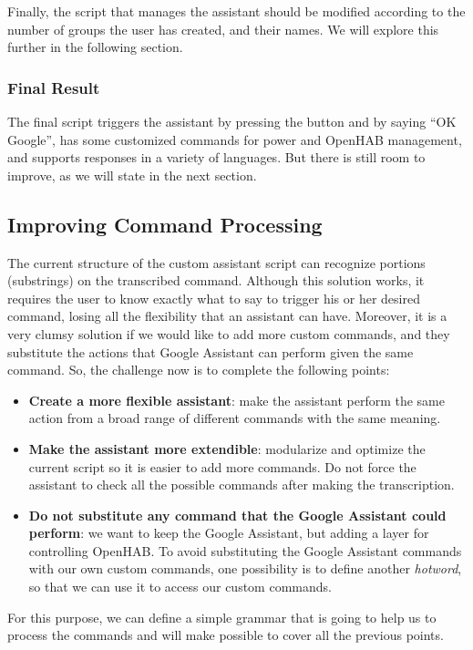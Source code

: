 Finally, the script that manages the assistant should be modified according to the number of groups the user has created, and their
names. We will explore this further in the following section.

\subsubsection{Final Result}
The final script triggers the assistant by pressing the button and by saying “OK Google”, has some customized commands for power
and OpenHAB management, and supports responses in a variety of languages. But there is still room to improve, as we will state in the
next section.

\subsection{Improving Command Processing}
The current structure of the custom assistant script can recognize portions (substrings) on the transcribed command. Although this
solution works, it requires the user to know exactly what to say to trigger his or her desired command, losing all the flexibility
that an assistant can have. Moreover, it is a very clumsy solution if we would like to add more custom commands, and they substitute
the actions that Google Assistant can perform given the same command. So, the challenge now is to complete the following points:
\begin{itemize}
	\item \textbf{Create a more flexible assistant}: make the assistant perform the same action from a broad range of different
	commands with the same meaning.
	\item \textbf{Make the assistant more extendible}: modularize and optimize the current script so it is easier to add more commands.
	Do not force the assistant to check all the possible commands after making the transcription.
	\item \textbf{Do not substitute any command that the Google Assistant could perform}: we want to keep the Google Assistant, but
	adding a layer for controlling OpenHAB. To avoid substituting the Google Assistant commands with our own custom commands,
	one possibility is to define another \textit{hotword}, so that we can use it to access our custom commands.
\end{itemize}

For this purpose, we can define a simple grammar that is going to help us to process the commands and will make possible to cover
all the previous points.

